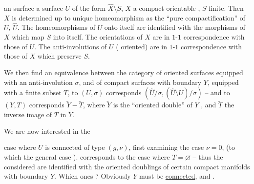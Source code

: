  an  surface a surface $U$ of the form $\widehat X\setminus S$, $X$ a compact orientable , $S$ finite. Then $X$ is determined up to unique homeomorphism as the ``pure compactification'' of $U$,  $\widehat U$.  The homeomorphisms of $U$ onto itself are identified with the morphisms of $X$ which map $S$ into itself. The orientations of $X$ are in $1$-$1$ correspondence with those of $U$. The anti-involutions of $U$ ( oriented) are in $1$-$1$ correspondence with those of $X$ which preserve $S$.

We then find an equivalence between the category of oriented  surfaces  equipped with an anti-involution $\sigma$, and of compact surfaces with boundary $Y$, equipped with a finite subset $T$, to $(U,\sigma)$ corresponds $(\widehat U/\sigma,(\widehat U\setminus U)/\sigma)$ -- and to $(Y,T)$ corresponds $\widetilde Y-\widetilde T$, where $\widetilde Y$ is the ``oriented double'' of $Y$ , and $\widetilde T$ the inverse image of $T$ in $\widetilde Y$.

We are now interested in the


case where $U$ is connected of type $(g,\nu)$, first examining the case $\nu=0$,  (to which the general case ).   corresponds to the case where $T=\varnothing$ -- thus the   considered  are identified with the oriented doublings of certain compact manifolds with boundary $Y$. Which ones ? Obviously $Y$ must be \uline{connected}, and .


